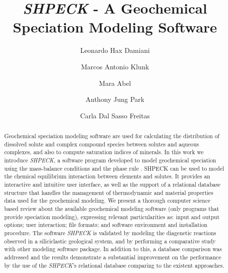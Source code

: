 \documentclass[preprint,12pt,3p]{elsarticle}
\begin{document}
\begin{frontmatter}

\title{\emph{SHPECK} - A Geochemical Speciation Modeling Software}

\author[label1]{Leonardo Hax Damiani}
\address[label1]{Informatics Institute, UFRGS, Porto Alegre, RS, Brazil}



\author[label2]{Marcos Antonio Klunk}
\address[label2]{Institute of Geoscience, UFRGS, Porto Alegre, RS, Brazil}

\author[label1]{Mara Abel}

\author[label3]{Anthony Jung Park}
\address[label3]{Sienna Geodynamics and Consulting, Inc., 101 Kirkwood Avenue, Suite 222, Bloomington, Indiana 47404}

\author[label1]{Carla Dal Sasso Freitas}

\begin{abstract}
Geochemical speciation modeling software are used for calculating the distribution of dissolved solute and complex compound species between solutes and aqueous complexes, and also to compute saturation indices of minerals. In this work we introduce \emph{SHPECK}, a software program developed to model geochemical speciation using the mass-balance conditions and the phase rule \cite{Garrels:65}. SHPECK can be used to model the chemical equilibrium interaction between elements and solutes. It provides an interactive and intuitive user interface, as well as the support of a relational database structure that handles the management of thermodynamic and material properties data used for the geochemical modeling. We present a thorough computer science based review about the available geochemical modeling software (only programs that provide speciation modeling), expressing relevant particularities as: input and output options; user interaction; file formats; and software environment and installation procedure. The software \emph{SHPECK} is validated by modeling the diagenetic reactions observed in a siliciclastic geological system, and by performing a comparative study with other modeling software package. In addition to this, a database comparison was addressed and the results demonstrate a substantial improvement on the performance by the use of the  \emph{SHPECK}'s relational database comparing to the existent approaches.
\end{abstract}


\end{frontmatter}
\end{document}

